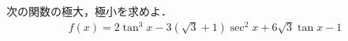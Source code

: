 \documentclass[../../main.tex]{subfiles}
\begin{document}
次の関数の極大，極小を求めよ．
\begin{align}
  f(x)=2\tan^3x-3(\sqrt{3}+1)\sec^2x+6\sqrt{3}\tan x-1
\end{align}
\end{document}
